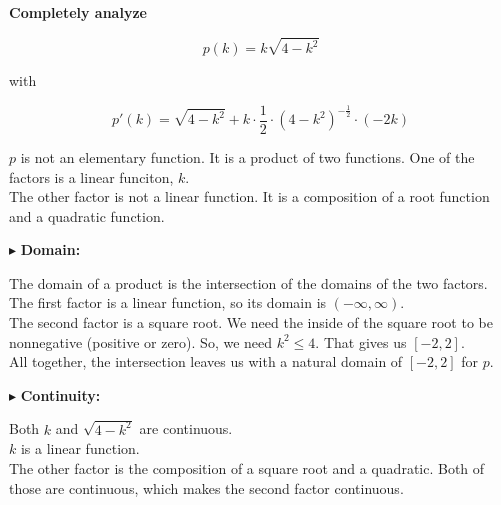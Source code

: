 \documentclass{ximera}
\begin{document}
\begin{example}


\textbf{\textcolor{purple!85!blue}{Completely analyze}}

\[
p(k) = k \sqrt{4-k^2}
\]


with


\[
p'(k) = \sqrt{4-k^2} + k \cdot \frac{1}{2} \cdot (4-k^2)^{-\tfrac{1}{2}} \cdot (-2k)
\]

\begin{remark}

$p$ is not an elementary function.  It is a product of two functions. One of the factors is a linear funciton, $k$. \\

The other factor is not a linear function.  It is a composition of a root function and a quadratic function. \\

\end{remark}




$\blacktriangleright$  \textbf{\textcolor{blue!55!black}{Domain:}} 

The domain of a product is the intersection of the domains of the two factors. \\

The first factor is a linear function, so its domain is $(-\infty, \infty)$. \\

The second factor is a square root. We need the inside of the square root to be nonnegative (positive or zero).  So, we need $k^2 \leq 4$. That gives us $[-2, 2]$. \\




All together, the intersection leaves us with a natural domain of $[-2, 2]$ for $p$.





$\blacktriangleright$  \textbf{\textcolor{blue!55!black}{Continuity:}} 

Both $k$ and $\sqrt{4 - k^2}$ are continuous. \\


$k$ is a linear function. \\


The other factor is the composition of a square root and a quadratic. Both of those are continuous, which makes the second factor continuous. \\




\end{example}
\end{document}
